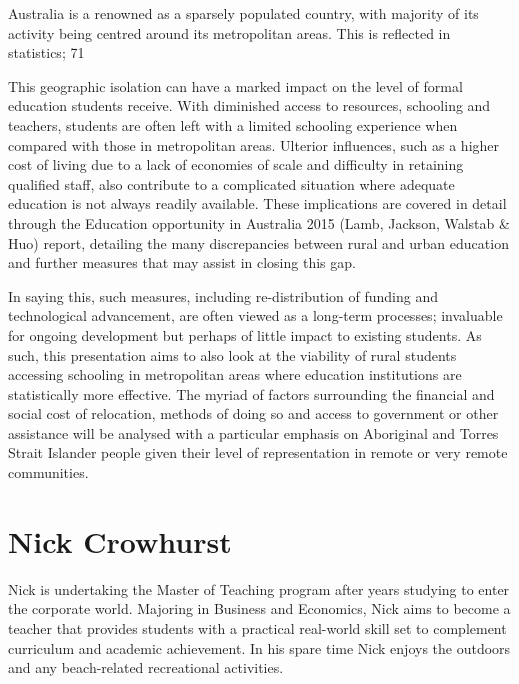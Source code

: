 \documentclass[twoside,14pt,a4paper,notitlepage]{memoir}
\begin{document}
Australia is a renowned as a sparsely populated country, with majority of its activity being centred around its metropolitan areas. This is reflected in statistics; 71%
 
This geographic isolation can have a marked impact on the level of formal education students receive. With diminished access to resources, schooling and teachers, students are often left with a limited schooling experience when compared with those in metropolitan areas. Ulterior influences, such as a higher cost of living due to a lack of economies of scale and difficulty in retaining qualified staff, also contribute to a complicated situation where adequate education is not always readily available. These implications are covered in detail through the Education opportunity in Australia 2015 (Lamb, Jackson, Walstab \& Huo) report, detailing the many discrepancies between rural and urban education and further measures that may assist in closing this gap.
 
In saying this, such measures, including re-distribution of funding and technological advancement, are often viewed as a long-term processes; invaluable for ongoing development but perhaps of little impact to existing students. As such, this presentation aims to also look at the viability of rural students accessing schooling in metropolitan areas where education institutions are statistically more effective. The myriad of factors surrounding the financial and social cost of relocation, methods of doing so and access to government or other assistance will be analysed with a particular emphasis on Aboriginal and Torres Strait Islander people given their level of representation in remote or very remote communities.

\section*{Nick Crowhurst}

Nick is undertaking the Master of Teaching program after years studying to enter the corporate world. Majoring in Business and Economics, Nick aims to become a teacher that provides students with a practical real-world skill set to complement curriculum and academic achievement. In his spare time Nick enjoys the outdoors and any beach-related recreational activities. 
\end{document}
